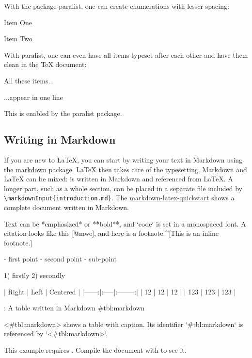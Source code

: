 With the package paralist, one can create enumerations with lesser spacing:

\begin{ltgexample}
\begin{compactenum}
  \item Item One
  \item Item Two
\end{compactenum}
\end{ltgexample}

With paralist, one can even have all items typeset after each other and have them clean in the TeX document:

\begin{ltgexample}
\begin{inparaenum}
  \item All these items...
  \item ...appear in one line
  \item This is enabled by the paralist package.
\end{inparaenum}
\end{ltgexample}

\subsection{Writing in Markdown}\label{sec:markdown}

\ifluatex
  If you are new to \LaTeX{}, you can start by writing your text in Markdown using the \href{https://ctan.org/pkg/markdown}{markdown} package.
  \LaTeX{} then takes care of the typesetting.
  Markdown and \LaTeX{} can be mixed:
   is written in Markdown and referenced from \LaTeX{}.
  A longer part, such as a whole section, can be placed in a separate file included by \verb|\markdownInput{introduction.md}|.
  The \href{https://github.com/latextemplates/markdown-latex-quickstart}{markdown-latex-quickstart} shows a complete document written in Markdown.

  \begin{ltgexample}
  \begin{markdown}
Text can be *emphasized* or **bold**, and `code` is set in a monospaced font.
A citation looks like this [@mwe], and here is a footnote.^[This is an inline footnote.]

- first point
- second point
  - sub-point

1) firstly
2) secondly

| Right | Left | Centered |
|------:|:-----|:--------:|
|    12 | 12   |    12    |
|   123 | 123  |   123    |

: A table written in Markdown {#tbl:markdown}

<#tbl:markdown> shows a table with caption.
Its identifier `{#tbl:markdown}` is referenced by `<#tbl:markdown>`.
\end{markdown}
  \end{ltgexample}
\else
  This example requires .
  Compile the document with  to see it.
\fi

